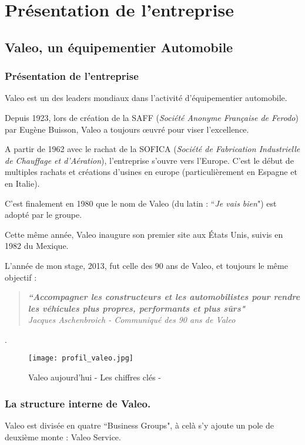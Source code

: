 \chapter{Présentation de l'entreprise}

\section{Valeo, un équipementier Automobile}

\subsection{Présentation de l'entreprise}

Valeo est un des leaders mondiaux dans l'activité d'équipementier automobile.

Depuis 1923, lors de création de la SAFF (\textit{Société Anonyme Française de Ferodo}) par Eugène Buisson, Valeo a toujours œuvré pour viser l'excellence. 

A partir de 1962 avec le rachat de la SOFICA (\textit{Société de Fabrication Industrielle de Chauffage et d'Aération}), l'entreprise s'ouvre vers l'Europe. C'est le début de multiples rachats et créations d'usines en europe (particulièrement en Espagne et en Italie).

C'est finalement en 1980 que le nom de Valeo (du latin : ``\textit{Je vais bien}") est adopté par le groupe.

Cette même année, Valeo inaugure son premier site aux États Unis, suivis en 1982 du Mexique.

L'année de mon stage, 2013, fut celle des 90 ans de Valeo, et toujours le même objectif :
\begin{quote}
\centering
\vspace{4mm}
	\textit{\textbf{``Accompagner les constructeurs et les automobilistes pour rendre les véhicules plus propres, performants et plus sûrs"}}\\
	\vspace{4mm}
	\textit{Jacques Aschenbroich - Communiqué des 90 ans de Valeo}
\end{quote}.

 \begin{figure}[H]
    \centering
    \texttt{[image: profil\_valeo.jpg]}
	\caption{Valeo aujourd'hui - Les chiffres clés - \cite{image.valeo.source} }\label{image.valeo} 
\end{figure}


\subsection{La structure interne de Valeo.}
Valeo est divisée en quatre ``Business Groups", à celà s'y ajoute un pole de deuxième monte : Valeo Service.

